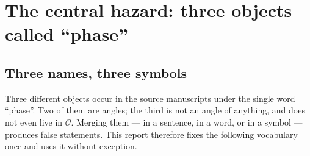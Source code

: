 \documentclass[11pt,letterpaper]{article}
\numberwithin{equation}{section}
\theoremstyle{definition}
\theoremstyle{remark}
\newcommand{\Ofin}{\mathcal O}
\begin{document}
\section{The central hazard: three objects called ``phase''}
\label{diff:sec:hazard}

\subsection{Three names, three symbols}
\label{diff:sub:threephases}

Three different objects occur in the source manuscripts under the single word
``phase''. Two of them are angles; the third is not an angle of anything, and
does not even live in $\Ofin$. Merging them --- in a sentence, in a word, or in
a symbol --- produces false statements. This report therefore fixes the
following vocabulary once and uses it without exception.
\end{document}
